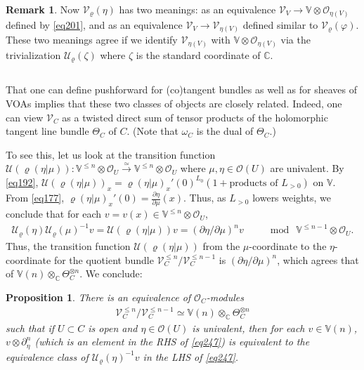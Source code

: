 \documentclass[11pt,b5paper,notitlepage]{article}
\theoremstyle{definition}
\newtheorem{rem}[df]{Remark}
\theoremstyle{plain}
\newtheorem{pp}[df]{Proposition}
\newcommand{\mc}{\mathcal}
\newcommand{\scr}{\mathscr}
\newcommand{\Vbb}{\mathbb V}
\newcommand{\Cbb}{\mathbb C}
\numberwithin{equation}{section}
\begin{document}
\begin{rem}
Now $\mc V_\varrho(\eta)$ has two meanings: as an equivalence $\scr V_V\rightarrow\Vbb\otimes\scr O_{\eta(V)}$ defined by \eqref{eq201}, and as an equivalence $\scr V_V\rightarrow\scr V_{\eta(V)}$ defined similar to $\mc V_\varrho(\varphi)$. These two meanings agree if we identify  $\scr V_{\eta(V)}$ with $\Vbb\otimes\scr O_{\eta(V)}$ via the trivialization $\mc U_\varrho(\zeta)$ where $\zeta$ is the standard coordinate of $\Cbb$.
\end{rem}



\subsection{}\label{lb150}

That one can define pushforward for (co)tangent bundles as well as for sheaves of VOAs implies that these two classes of objects are closely related. Indeed, one can view $\scr V_C$ as a twisted direct sum of tensor products of the holomorphic tangent line bundle $\Theta_C$ of $C$.  (Note that $\omega_C$ is the dual of $\Theta_C$.)

To see this, let us look at the transition function $\mc U(\varrho(\eta|\mu)):\Vbb^{\leq n}\otimes\scr O_U\xrightarrow{\simeq}\Vbb^{\leq n}\otimes\scr O_U$ where $\mu,\eta\in\scr O(U)$ are univalent. By \eqref{eq192}, $\mc U(\varrho(\eta|\mu))_x=\varrho(\eta|\mu)_x'(0)^{L_0}(1+\text{products of }L_{>0})$ on $\Vbb$. From \eqref{eq177}, $\varrho(\eta|\mu)_x'(0)=\frac{\partial\eta}{\partial\mu}(x)$. Thus, as $L_{>0}$ lowers weights, we conclude that for each $v=v(x)\in\Vbb^{\leq n}\otimes\scr O_U$,
\begin{align}
\mc U_\varrho(\eta)\mc U_\varrho(\mu)^{-1}v=\mc U(\varrho(\eta|\mu))v=(\partial\eta/\partial\mu)^nv\qquad\mod~\Vbb^{\leq n-1}\otimes\scr O_U.
\end{align}
Thus, the transition function $\mc U(\varrho(\eta|\mu))$ from the $\mu$-coordinate to the $\eta$-coordinate for the quotient bundle $\scr V^{\leq n}_C/\scr V^{\leq n-1}_C$ is $(\partial\eta/\partial\mu)^n$, which agrees that of $\Vbb(n)\otimes_\Cbb\Theta_C^{\otimes n}$. We conclude:
\begin{pp}\label{lb178}
There is an equivalence of $\scr O_C$-modules
\begin{align}
\scr V^{\leq n}_C/\scr V^{\leq n-1}_C\simeq \Vbb(n)\otimes_\Cbb\Theta_C^{\otimes n}\label{eq247}
\end{align}
such that if $U\subset C$ is open and $\eta\in\scr O(U)$ is univalent, then for each $v\in\Vbb(n)$, $v\otimes \partial_\eta^n$ (which is an element in the RHS of \eqref{eq247}) is equivalent to the equivalence class of $\mc U_\varrho(\eta)^{-1}v$ in the LHS of \eqref{eq247}.
\end{pp}
\end{document}
